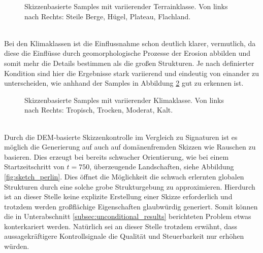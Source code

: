 \begin{figure}[htbp]
    \centering
    \caption{Skizzenbasierte Samples mit variierender Terrainklasse. Von links nach Rechts: Steile Berge, Hügel, Plateau, Flachland.}
    \label{fig:sketch_terrains}
\end{figure} \\
Bei den Klimaklassen ist die Einflussnahme schon deutlich klarer, vermutlich, da diese die Einflüsse durch geomorphologische Prozesse der Erosion abbilden und somit mehr die Details bestimmen als die großen Strukturen. Je nach definierter Kondition sind hier die Ergebnisse stark variierend und eindeutig von einander zu unterscheiden, wie anhhand der Samples in Abbildung \ref{fig:sketch_climates} gut zu erkennen ist. 
\begin{figure}[htbp]
    \centering
    \caption{Skizzenbasierte Samples mit variierender Klimaklasse. Von links nach Rechts: Tropisch, Trocken, Moderat, Kalt.}
    \label{fig:sketch_climates}
\end{figure} \\
Durch die \ac{DEM}-basierte Skizzenkontrolle im Vergleich zu Signaturen ist es möglich die Generierung auf auch auf domänenfremden Skizzen wie Rauschen zu basieren. Dies erzeugt bei bereits schwacher Orientierung, wie bei einem Startzeitschritt von $t=750$, überzeugende Landschaften, siehe Abbildung \ref{fig:sketch_perlin}. Dies öffnet die Möglichkeit die schwach erlernten globalen Strukturen durch eine solche grobe Strukturgebung zu approximieren. Hierdurch ist an dieser Stelle keine explizite Erstellung einer Skizze erforderlich und trotzdem werden großflächige Eigenschaften glaubwürdig generiert. Somit können die in Unterabschnitt \ref{subsec:unconditional_results} berichteten Problem etwas konterkariert werden. Natürlich sei an dieser Stelle trotzdem erwähnt, dass aussagekräftigere Kontrollsignale die Qualität und Steuerbarkeit nur erhöhen würden.
